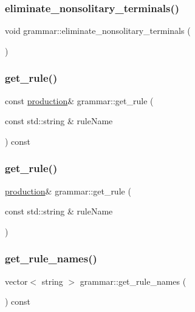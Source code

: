 \subsubsection{\texorpdfstring{eliminate\_nonsolitary\_terminals()}{eliminate\_nonsolitary\_terminals()}}
{\footnotesize\ttfamily void grammar\+::eliminate\+\_\+nonsolitary\+\_\+terminals (\begin{DoxyParamCaption}{ }\end{DoxyParamCaption})}

\mbox{\label{classgrammar_a0a159a4ba2e48cd321f7f0653ba2e078}} 
\subsubsection{\texorpdfstring{get\_rule()}{get\_rule()}\hspace{0.1cm}{\footnotesize\ttfamily [1/2]}}
{\footnotesize\ttfamily const \mbox{\hyperlink{classproduction}{production}}\& grammar\+::get\+\_\+rule (\begin{DoxyParamCaption}\item[{const std\+::string \&}]{rule\+Name }\end{DoxyParamCaption}) const}

\mbox{\label{classgrammar_ad4b972df16ac59d6f81a3ca9d875beff}} 
\subsubsection{\texorpdfstring{get\_rule()}{get\_rule()}\hspace{0.1cm}{\footnotesize\ttfamily [2/2]}}
{\footnotesize\ttfamily \mbox{\hyperlink{classproduction}{production}}\& grammar\+::get\+\_\+rule (\begin{DoxyParamCaption}\item[{const std\+::string \&}]{rule\+Name }\end{DoxyParamCaption})}

\mbox{\label{classgrammar_a20f84bcd1749e5b68340b45f247a532b}} 
\subsubsection{\texorpdfstring{get\_rule\_names()}{get\_rule\_names()}}
{\footnotesize\ttfamily vector$<$ string $>$ grammar\+::get\+\_\+rule\+\_\+names (\begin{DoxyParamCaption}{ }\end{DoxyParamCaption}) const}

